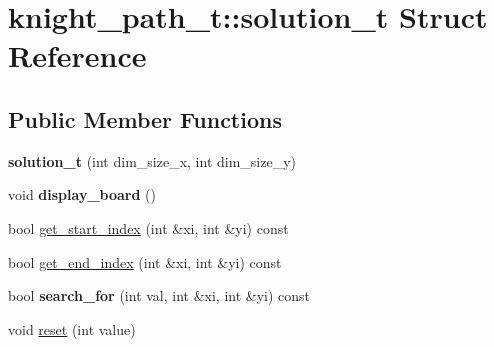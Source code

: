 \hypertarget{structknight__path__t_1_1solution__t}{\section{knight\-\_\-path\-\_\-t\-:\-:solution\-\_\-t Struct Reference}
\label{structknight__path__t_1_1solution__t}
}
\subsection*{Public Member Functions}
\begin{DoxyCompactItemize}
\item 
\hypertarget{structknight__path__t_1_1solution__t_ab72a2b74c697bdc5bde229af6b67f7b6}{{\bfseries solution\-\_\-t} (int dim\-\_\-size\-\_\-x, int dim\-\_\-size\-\_\-y)}\label{structknight__path__t_1_1solution__t_ab72a2b74c697bdc5bde229af6b67f7b6}

\item 
\hypertarget{structknight__path__t_1_1solution__t_acf045f0bda995d4f33a8cc6180684cb1}{void {\bfseries display\-\_\-board} ()}\label{structknight__path__t_1_1solution__t_acf045f0bda995d4f33a8cc6180684cb1}

\item 
bool \hyperlink{structknight__path__t_1_1solution__t_aff530e31311e5c5978140a398f8d674b}{get\-\_\-start\-\_\-index} (int \&xi, int \&yi) const 
\item 
bool \hyperlink{structknight__path__t_1_1solution__t_a61d525f64a1f5654f658e56d12007f7f}{get\-\_\-end\-\_\-index} (int \&xi, int \&yi) const 
\item 
\hypertarget{structknight__path__t_1_1solution__t_adcd9ccd89422620593177d73ddec9cbd}{bool {\bfseries search\-\_\-for} (int val, int \&xi, int \&yi) const }\label{structknight__path__t_1_1solution__t_adcd9ccd89422620593177d73ddec9cbd}

\item 
void \hyperlink{structknight__path__t_1_1solution__t_a7a24f28ec5d656977de14b9de7d977fc}{reset} (int value)
\end{DoxyCompactItemize}
